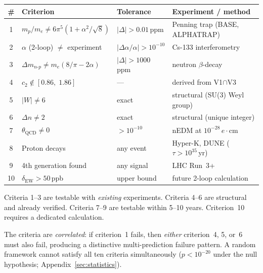 \begin{center}
\renewcommand{\arraystretch}{1.25}\small
\begin{tabular}{clp{3.2cm}p{3.8cm}}
\toprule
\# & \textbf{Criterion} & \textbf{Tolerance} & \textbf{Experiment / method}\\
\midrule
1 & $m_p/m_e \neq 6\pi^5(1+\alpha^2/\!\sqrt{8})$
  & $|\Delta|>0.01\,$ppm & Penning trap (BASE, ALPHATRAP)\\
2 & $\alpha$ (2-loop) $\neq$ experiment
  & $|\Delta\alpha/\alpha|>10^{-10}$ & Cs-133 interferometry\\
3 & $\Delta m_{n\text{-}p}\neq m_e(8/\pi-2\alpha)$
  & $|\Delta|>1000\,$ppm & neutron $\beta$-decay\\
4 & $c_2\notin [0.86,\;1.86]$
  & --- & derived from V1$\cap$V3\\
5 & $|W|\neq 6$
  & exact & structural (SU(3) Weyl group)\\
6 & $\Delta n\neq 2$
  & exact & structural (unique integer)\\
7 & $\theta_{\mathrm{QCD}}\neq 0$
  & $>10^{-10}$ & nEDM at $10^{-28}\,e\!\cdot\!\mathrm{cm}$\\
8 & Proton decays
  & any event & Hyper-K, DUNE ($\tau>10^{35}\,$yr)\\
9 & 4th generation found
  & any signal & LHC Run~3+\\
10 & $\delta_{\mathrm{EW}}>50\,$ppb
  & upper bound & future 2-loop calculation\\
\bottomrule
\end{tabular}
\end{center}

\noindent
Criteria 1--3 are testable with \emph{existing} experiments.
Criteria 4--6 are structural and already verified.
Criteria 7--9 are testable within 5--10 years.
Criterion~10 requires a dedicated calculation.

The criteria are \emph{correlated}: if criterion~1 fails,
then \emph{either} criterion~4, 5, or~6 must also fail, producing
a distinctive multi-prediction failure pattern. A random framework
cannot satisfy all ten criteria simultaneously ($p<10^{-20}$ under
the null hypothesis; Appendix~\ref{sec:statistics}).

